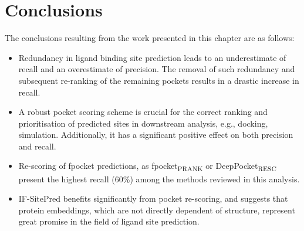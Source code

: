 \section{Conclusions}

The conclusions resulting from the work presented in this chapter are as follows:

\begin{itemize}

\item Redundancy in ligand binding site prediction leads to an underestimate of recall and an overestimate of precision. The removal of such redundancy and subsequent re-ranking of the remaining pockets results in a drastic increase in recall.

\item A robust pocket scoring scheme is crucial for the correct ranking and prioritisation of predicted sites in downstream analysis, e.g., docking, simulation. Additionally, it has a significant positive effect on both precision and recall.

\item Re-scoring of fpocket predictions, as fpocket\textsubscript{PRANK} or DeepPocket\textsubscript{RESC} present the highest recall (60\%) among the methods reviewed in this analysis.

\item IF-SitePred benefits significantly from pocket re-scoring, and suggests that protein embeddings, which are not directly dependent of structure, represent great promise in the field of ligand site prediction.

\end{itemize}

